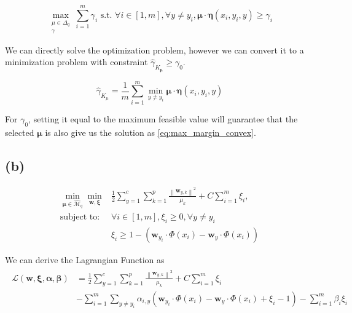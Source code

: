 \documentclass{article}
\begin{document}
 \begin{equation}
    \max _{\substack{\mu \in \Delta_{q} \\ \gamma}} \sum_{i=1}^{m} \gamma_{i} \text { s.t. } \forall i \in[1, m], \forall y \neq y_{i}, \boldsymbol{\mu} \cdot \boldsymbol{\eta}\left(x_{i}, y_{i}, y\right) \geq \gamma_{i}
\label{eq:max_margin_convex}
\end{equation}


We can directly solve the optimization problem, however we can convert it to a minimization problem with constraint $\widehat{\gamma}_{K_{\boldsymbol{\mu}}} \geq \gamma_{0}$.

\begin{equation}
    \widehat{\gamma}_{K_{\mu}}=\frac{1}{m} \sum_{i=1}^{m} \min _{y \neq y_{i}} \boldsymbol{\mu} \cdot \boldsymbol{\eta}\left(x_{i}, y_{i}, y\right)
\end{equation}

For $\gamma_0$, setting it equal to the maximum feasible value will guarantee that the selected $\bm{\mu}$ is also give us the solution as \eqref{eq:max_margin_convex}.

\subsection*{(b)}

\begin{equation}
    \begin{aligned}
        \min _{\boldsymbol{\mu} \in \widehat{\mathcal{M}}_{q}} \min _{\mathbf{w}, \boldsymbol{\xi}} &\frac{1}{2} \sum_{y=1}^{c} \sum_{k=1}^{p} \frac{\left\|\mathbf{w}_{y, k}\right\|^{2}}{\mu_{k}}+C \sum_{i=1}^{m} \xi_{i}, \\
        \text{subject to: } &\forall i \in[1, m], \xi_{i} \geq 0, \forall y \neq y_{i} \\
        &\xi_{i} \geq 1-\left(\mathbf{w}_{y_{i}} \cdot \Phi\left(x_{i}\right)-\mathbf{w}_{y} \cdot \Phi\left(x_{i}\right)\right)
    \end{aligned}
\end{equation}




We can derive the Lagrangian Function as
\begin{align}
    \begin{aligned}
        \mathcal{L}(\mathbf{w}, \boldsymbol{\xi}, \bm{\alpha}, \bm{\beta}) 
        &= \frac{1}{2} \sum_{y=1}^{c} \sum_{k=1}^{p} \frac{\left\|\bm{w}_{y, k}\right\|^{2}}{\mu_{k}}
        + C \sum_{i=1}^{m} \xi_{i} \\
        &- \sum_{i=1}^{m} 
           \sum_{y \neq y_i}
            \alpha_{i, y}
            \left(
                \bm{w}_{y_{i}} \cdot \Phi\left(x_{i}\right)
                - \bm{w}_{y} \cdot \Phi\left(x_{i}\right) 
                + \xi_{i}
                - 1
            \right)
        - \sum_{i=1}^{m} \beta_{i} \xi_{i} 
    \end{aligned}
\end{align}
\end{document}
